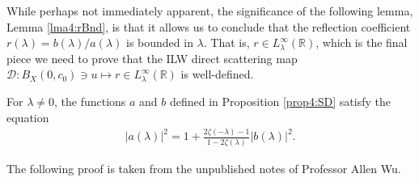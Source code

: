 \documentclass[../dissertation.tex]{subfiles}
\begin{document}
While perhaps not immediately apparent, the significance of the following lemma, 
Lemma \ref{lma4:rBnd}, is that it allows us to conclude 
that the reflection coefficient $r(\lambda) = b(\lambda)/a(\lambda)$ is bounded 
in $\lambda.$ That is, 
$r \in L_\lambda^\infty(\mathbb R)$, which is the final piece we need to prove 
that the ILW direct scattering map \label{sym:DM}
$\mathscr D: B_X(0, c_0) \ni u \mapsto r \in L_\lambda^\infty(\mathbb R)$ is 
well-defined.\label{sym4:dsm}

\begin{lma}\label{lma4:rBnd}
	For $\lambda \ne 0$, the functions $a$ and $b$ defined in Proposition \ref{prop4:SD} satisfy
	the equation 
	\begin{align}\label{eq4:rbnd}
		\big| a(\lambda) \big|^2
			= 1 + \frac{2\zeta(-\lambda) - 1}{1 - 2 \zeta(\lambda)} 
				\big| b(\lambda) \big|^2.
	\end{align}
\end{lma}
The following proof is taken from the unpublished notes of Professor Allen Wu.
\end{document}
